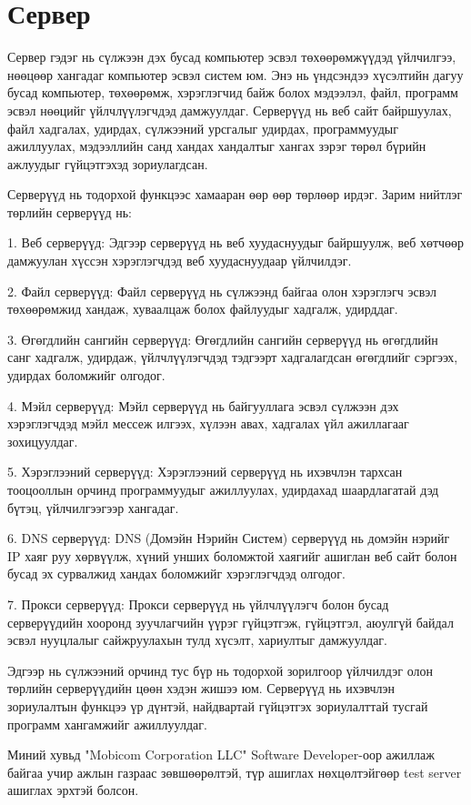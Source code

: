 \section{Сервер}
Сервер гэдэг нь сүлжээн дэх бусад компьютер эсвэл төхөөрөмжүүдэд үйлчилгээ, нөөцөөр хангадаг компьютер эсвэл систем юм. Энэ нь үндсэндээ хүсэлтийн дагуу бусад компьютер, төхөөрөмж, хэрэглэгчид байж болох мэдээлэл, файл, программ эсвэл нөөцийг үйлчлүүлэгчдэд дамжуулдаг. Серверүүд нь веб сайт байршуулах, файл хадгалах, удирдах, сүлжээний урсгалыг удирдах, программуудыг ажиллуулах, мэдээллийн санд хандах хандалтыг хангах зэрэг төрөл бүрийн ажлуудыг гүйцэтгэхэд зориулагдсан.

Серверүүд нь тодорхой функцээс хамааран өөр өөр төрлөөр ирдэг. Зарим нийтлэг төрлийн серверүүд нь:

1. Веб серверүүд: Эдгээр серверүүд нь веб хуудаснуудыг байршуулж, веб хөтчөөр дамжуулан хүссэн хэрэглэгчдэд веб хуудаснуудаар үйлчилдэг.

2. Файл серверүүд: Файл серверүүд нь сүлжээнд байгаа олон хэрэглэгч эсвэл төхөөрөмжид хандаж, хуваалцаж болох файлуудыг хадгалж, удирддаг.

3. Өгөгдлийн сангийн серверүүд: Өгөгдлийн сангийн серверүүд нь өгөгдлийн санг хадгалж, удирдаж, үйлчлүүлэгчдэд тэдгээрт хадгалагдсан өгөгдлийг сэргээх, удирдах боломжийг олгодог.

4. Мэйл серверүүд: Мэйл серверүүд нь байгууллага эсвэл сүлжээн дэх хэрэглэгчдэд мэйл мессеж илгээх, хүлээн авах, хадгалах үйл ажиллагааг зохицуулдаг.

5. Хэрэглээний серверүүд: Хэрэглээний серверүүд нь ихэвчлэн тархсан тооцооллын орчинд программуудыг ажиллуулах, удирдахад шаардлагатай дэд бүтэц, үйлчилгээгээр хангадаг.

6. DNS серверүүд: DNS (Домэйн Нэрийн Систем) серверүүд нь домэйн нэрийг IP хаяг руу хөрвүүлж, хүний унших боломжтой хаягийг ашиглан веб сайт болон бусад эх сурвалжид хандах боломжийг хэрэглэгчдэд олгодог.

7. Прокси серверүүд: Прокси серверүүд нь үйлчлүүлэгч болон бусад серверүүдийн хооронд зуучлагчийн үүрэг гүйцэтгэж, гүйцэтгэл, аюулгүй байдал эсвэл нууцлалыг сайжруулахын тулд хүсэлт, хариултыг дамжуулдаг.

Эдгээр нь сүлжээний орчинд тус бүр нь тодорхой зорилгоор үйлчилдэг олон төрлийн серверүүдийн цөөн хэдэн жишээ юм. Серверүүд нь ихэвчлэн зориулалтын функцээ үр дүнтэй, найдвартай гүйцэтгэх зориулалттай тусгай программ хангамжийг ажиллуулдаг.

Миний хувьд "Mobicom Corporation LLC" Software Developer-оор ажиллаж байгаа учир ажлын газраас зөвшөөрөлтэй, түр ашиглах нөхцөлтэйгөөр test server ашиглах эрхтэй болсон.

